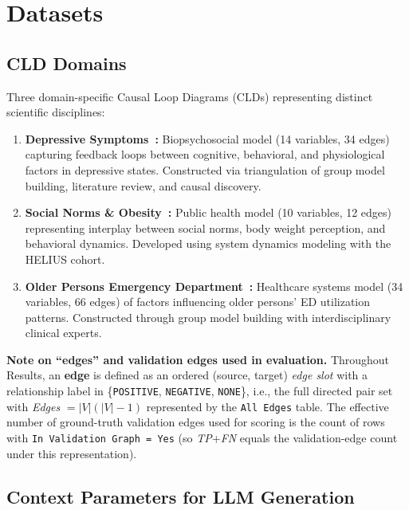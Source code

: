 \section{Datasets}

\subsection{CLD Domains}
Three domain-specific Causal Loop Diagrams (CLDs) representing distinct scientific disciplines:
\begin{enumerate}[noitemsep]
    \item \textbf{Depressive Symptoms~\cite{uleman2024triangulation}:} Biopsychosocial model (14 variables, 34 edges) capturing feedback loops between cognitive, behavioral, and physiological factors in depressive states. Constructed via triangulation of group model building, literature review, and causal discovery.
    \item \textbf{Social Norms \& Obesity~\cite{crielaard2020socialnorms}:} Public health model (10 variables, 12 edges) representing interplay between social norms, body weight perception, and behavioral dynamics. Developed using system dynamics modeling with the HELIUS cohort.
    \item \textbf{Older Persons Emergency Department~\cite{smeekes2023emergency}:} Healthcare systems model (34 variables, 66 edges) of factors influencing older persons' ED utilization patterns. Constructed through group model building with interdisciplinary clinical experts.
\end{enumerate}

\textbf{Note on ``edges'' and validation edges used in evaluation.} Throughout Results, an \textbf{edge} is defined as an ordered (source, target) \textit{edge slot} with a relationship label in \{\texttt{POSITIVE}, \texttt{NEGATIVE}, \texttt{NONE}\}, i.e., the full directed pair set with \textit{Edges} $=|V|(|V|-1)$ represented by the \texttt{All Edges} table. The effective number of ground-truth validation edges used for scoring is the count of rows with \texttt{In Validation Graph = Yes} (so \textit{TP}+\textit{FN} equals the validation-edge count under this representation).

\subsection{Context Parameters for LLM Generation}

